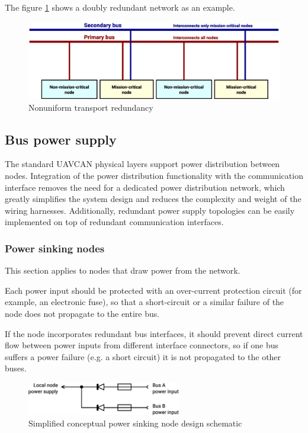 The figure \ref{fig:physical_nonuniform_transport_redundancy} shows a doubly redundant network as an example.

\begin{figure}[H]
    \centering
	\includegraphics[width=\textwidth]{physical/nonuniform_bus_redundancy}
	\caption{Nonuniform transport redundancy\label{fig:physical_nonuniform_transport_redundancy}}
\end{figure}

\subsection{Bus power supply}

The standard UAVCAN physical layers support power distribution between nodes.
Integration of the power distribution functionality with the communication interface
removes the need for a dedicated power distribution network,
which greatly simplifies the system design and reduces the complexity and weight of the wiring harnesses.
Additionally, redundant power supply topologies can be easily implemented on top of redundant communication interfaces.

\subsubsection{Power sinking nodes}

This section applies to nodes that draw power from the network.

Each power input should be protected with an over-current protection circuit (for example, an electronic fuse),
so that a short-circuit or a similar failure of the node does not propagate to the entire bus.

If the node incorporates redundant bus interfaces,
it should prevent direct current flow between power inputs from different interface connectors,
so if one bus suffers a power failure (e.g. a short circuit) it is not propagated to the other buses.

\begin{figure}[H]
    \centering
	\includegraphics[width=0.6\textwidth]{physical/redundant_bus_power_sink}
	\caption{Simplified conceptual power sinking node design schematic\label{fig:physical_redundant_bus_power_sink}}
\end{figure}

